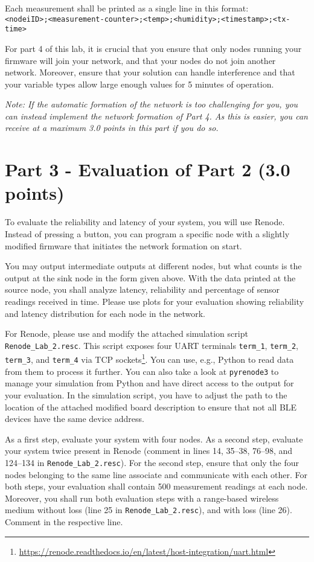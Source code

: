\documentclass[11pt]{article}
\begin{document}
Each measurement shall be printed as a single line in this format:\\\texttt{<nodeiID>;<measurement-counter>;<temp>;<humidity>;<timestamp>;<tx-time>}

For part 4 of this lab, it is crucial that you ensure that only nodes running your firmware will join your network, and that your nodes do not join another network. Moreover, ensure that your solution can handle interference and that your variable types allow large enough values for 5 minutes of operation.

\textit{Note: If the automatic formation of the network is too challenging for you, you can instead implement the network formation of Part 4. As this is easier, you can receive at a maximum 3.0 points in this part if you do so.}

\section*{Part 3 - Evaluation of Part 2 (3.0 points)}


To evaluate the reliability and latency of your system, you will use Renode. Instead of pressing a button, you can program a specific node with a slightly modified firmware that initiates the network formation on start.

You may output intermediate outputs at different nodes, but what counts is the output at the sink node in the form given above. With the data printed at the source node, you shall analyze latency, reliability and percentage of sensor readings received in time. Please use plots for your evaluation showing reliability and latency distribution for each node in the network.

For Renode, please use and modify the attached simulation script \texttt{Renode\_Lab\_2.resc}. This script exposes four UART terminals \texttt{term\_1}, \texttt{term\_2}, \texttt{term\_3}, and \texttt{term\_4} via TCP sockets\footnote{\url{https://renode.readthedocs.io/en/latest/host-integration/uart.html}}. You  can use, e.g., Python to read data from them to process it further. You can also take a look at \texttt{pyrenode3} to manage your simulation from Python and have direct access to the output for your evaluation. In the simulation script, you have to adjust the path to the location of the attached modified board description to ensure that not all BLE devices have the same device address.

As a first step, evaluate your system with four nodes. As a second step, evaluate your system twice present in Renode (comment in lines 14, 35–38, 76–98, and 124–134 in \texttt{Renode\_Lab\_2.resc}). For the second step, ensure that only the four nodes belonging to the same line associate and communicate with each other. For both steps, your evaluation shall contain 500 measurement readings at each node. Moreover, you shall run both evaluation steps with a range-based wireless medium without loss (line 25 in \texttt{Renode\_Lab\_2.resc}), and with loss (line 26). Comment in the respective line.
\end{document}
